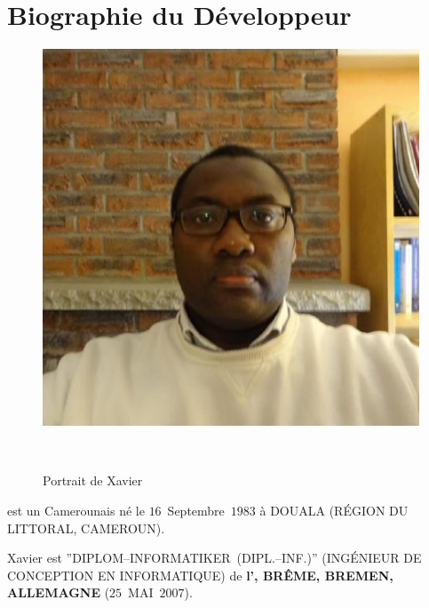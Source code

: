 \vspace{-1.1em}
\section{Biographie du D\'eveloppeur}\label{chap:biography}
\vspace{-0.9em}
\begin{figure}[!htpb]
\centering
\includegraphics[scale=0.35]{../images/XavierNOUNDOU-2}
\caption{Portrait de Xavier}~\label{fig:xaviernoumbis}
\end{figure}

\textbf{\myfullacademicname} est un Camerounais
n\'e le $16$~Septembre~$1983$ \`a DOUALA (R\'EGION DU LITTORAL, CAMEROUN).

Xavier est ''DIPLOM--INFORMATIKER~(DIPL.--INF.)''
(ING\'ENIEUR DE CONCEPTION EN INFORMATIQUE) de
\textbf{l'\bremenu, BR\^EME, BREMEN, ALLEMAGNE}
($25$~MAI~$2007$).